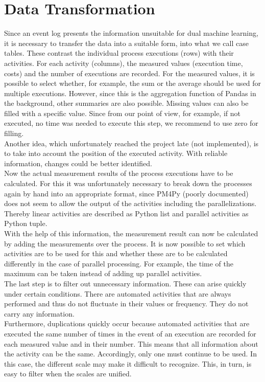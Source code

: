     \section{Data Transformation}
    Since an event log presents the information unsuitable for dual machine learning, it is necessary to transfer the data into a suitable form, into what we call case tables. These contrast the individual process executions (rows) with their activities. For each activity (columns), the measured values (execution time, costs) and the number of executions are recorded. For the measured values, it is possible to select whether, for example, the sum or the average should be used for multiple executions. However, since this is the aggregation function of Pandas in the background, other summaries are also possible. Missing values can also be filled with a specific value. Since from our point of view, for example, if not executed, no time was needed to execute this step, we recommend to use zero for filling.\\
    Another idea, which unfortunately reached the project late (not implemented), is to take into account the position of the executed activity. With reliable information, changes could be better identified.\\
    Now the actual measurement results of the process executions have to be calculated. For this it was unfortunately necessary to break down the processes again by hand into an appropriate format, since PM4Py (poorly documented) does not seem to allow the output of the activities including the parallelizations. Thereby linear activities are described as Python list and parallel activities as Python tuple.\\
    With the help of this information, the measurement result can now be calculated by adding the measurements over the process. It is now possible to set which activities are to be used for this and whether these are to be calculated differently in the case of parallel processing. For example, the time of the maximum can be taken instead of adding up parallel activities.\\
    The last step is to filter out unnecessary information. These can arise quickly under certain conditions. There are automated activities that are always performed and thus do not fluctuate in their values or frequency. They do not carry any information.\\
    Furthermore, duplications quickly occur because automated activities that are executed the same number of times in the event of an execution are recorded for each measured value and in their number. This means that all information about the activity can be the same. Accordingly, only one must continue to be used. In this case, the different scale may make it difficult to recognize. This, in turn, is easy to filter when the scales are unified.\\
